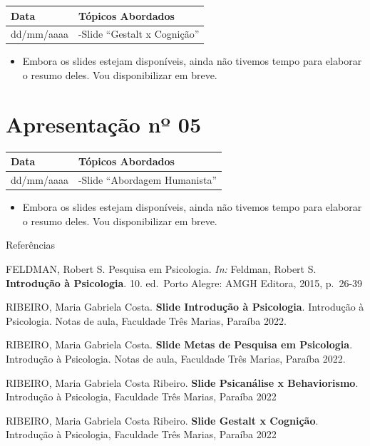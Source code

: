 \documentclass[
]{book}
\providecommand{\tightlist}{%
  \setlength{\itemsep}{0pt}\setlength{\parskip}{0pt}}
\begin{document}
\begin{longtable}[]{@{}ll@{}}
\toprule()
Data & Tópicos Abordados \\
\midrule()
\endhead
dd/mm/aaaa & -Slide ``Gestalt x Cognição'' \\
\bottomrule()
\end{longtable}

\begin{itemize}
\tightlist
\item
  Embora os slides estejam disponíveis, ainda não tivemos tempo para elaborar o resumo deles. Vou disponibilizar em breve.
\end{itemize}

\hypertarget{apresentauxe7uxe3o-nuxba-05-1}{%
\section{Apresentação nº 05}\label{apresentauxe7uxe3o-nuxba-05-1}}

\begin{longtable}[]{@{}ll@{}}
\toprule()
Data & Tópicos Abordados \\
\midrule()
\endhead
dd/mm/aaaa & -Slide ``Abordagem Humanista'' \\
\bottomrule()
\end{longtable}

\begin{itemize}
\tightlist
\item
  Embora os slides estejam disponíveis, ainda não tivemos tempo para elaborar o resumo deles. Vou disponibilizar em breve.
\end{itemize}

Referências

FELDMAN, Robert S. Pesquisa em Psicologia. \emph{In:} Feldman, Robert S. \textbf{Introdução à Psicologia}. 10. ed.~Porto Alegre: AMGH Editora, 2015, p.~26-39

RIBEIRO, Maria Gabriela Costa. \textbf{Slide Introdução à Psicologia}. Introdução à Psicologia. Notas de aula, Faculdade Três Marias, Paraíba 2022.

RIBEIRO, Maria Gabriela Costa. \textbf{Slide Metas de Pesquisa em Psicologia}. Introdução à Psicologia. Notas de aula, Faculdade Três Marias, Paraíba 2022.

RIBEIRO, Maria Gabriela Costa Ribeiro. \textbf{Slide Psicanálise x Behaviorismo}. Introdução à Psicologia, Faculdade Três Marias, Paraíba 2022

RIBEIRO, Maria Gabriela Costa Ribeiro. \textbf{Slide Gestalt x Cognição}. Introdução à Psicologia, Faculdade Três Marias, Paraíba 2022
\end{document}

